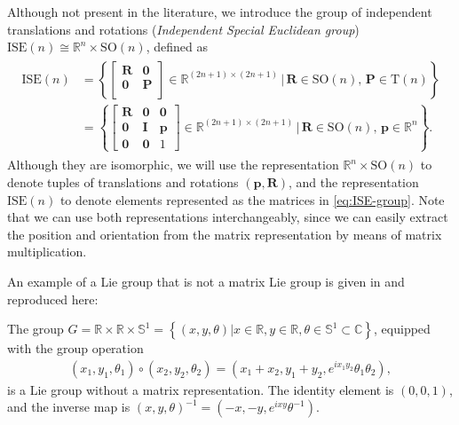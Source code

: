 \begin{example}\label{ex:independent-translation-rotation-ISE}
    Although not present in the literature, we introduce the group of independent translations and rotations (\emph{Independent Special Euclidean group}) $\text{ISE}(n)\cong\mathbb{R}^n\times\text{SO}(n)$, defined as
    \begin{align}
        \begin{split}
            \text{ISE}(n) &= \left\{\begin{bmatrix}
            \mathbf{R} & \mathbf{0}\\
            \mathbf{0} & \mathbf{P}\\
            \end{bmatrix}\in\mathbb{R}^{(2n+1)\times(2n+1)}\,|\, \mathbf{R}\in\text{SO}(n),\,\mathbf{P}\in\text{T}(n)\right\}\\
            &= \left\{\begin{bmatrix}
            \mathbf{R} & \mathbf{0} & \mathbf{0}\\
            \mathbf{0} & \mathbf{I} & \mathbf{p}\\
            \mathbf{0} & \mathbf{0} & 1
            \end{bmatrix}\in\mathbb{R}^{(2n+1)\times(2n+1)}\,|\, \mathbf{R}\in\text{SO}(n),\,\mathbf{p}\in\mathbb{R}^n\right\}.
        \end{split} \label{eq:ISE-group}
    \end{align}
    Although they are isomorphic, we will use the representation $\mathbb{R}^n\times \text{SO}(n)$ to denote tuples of translations and rotations $(\mathbf{p},\mathbf{R})$, and the representation $\text{ISE}(n)$ to denote elements represented as the matrices in \eqref{eq:ISE-group}. Note that we can use both representations interchangeably, since we can easily extract the position and orientation from the matrix representation by means of matrix multiplication.
\end{example}

\begin{example}\label{ex:non-matrix-lie-group}
    An example of a Lie group that is not a matrix Lie group is given in \citet[p. 25]{Hall2015} and reproduced here:

    The group $G = \mathbb{R} \times \mathbb{R} \times \mathbb{S}^1 = \left\{(x, y, \theta) | x \in \mathbb{R}, y \in \mathbb{R}, \theta \in \mathbb{S}^1\subset\mathbb{C}\right\}$, equipped with the group operation
    \begin{align}
        (x_1, y_1, \theta_1)\circ (x_2, y_2, \theta_2) = (x_1 + x_2, y_1 + y_2, e^{ix_1y_2}\theta_1\theta_2),
    \end{align}
    is a Lie group without a matrix representation. The identity element is $(0, 0, 1)$, and the inverse map is $(x, y, \theta)^{-1} = (-x, -y, e^{ixy}\theta^{-1})$.
\end{example} 


